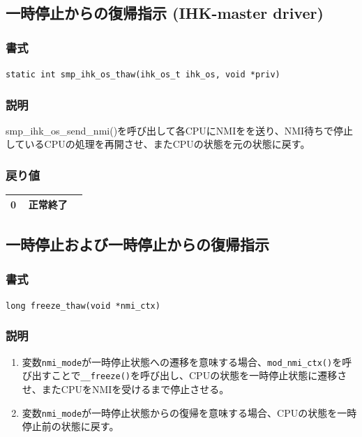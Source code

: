 \documentclass[twoside,11pt,fleqn]{book}
\begin{document}
\subsection{一時停止からの復帰指示 (IHK-master driver)}
\subsubsection*{書式}{\quad} \texttt{static int smp\_ihk\_os\_thaw(ihk\_os\_t ihk\_os, void *priv)}
\subsubsection*{説明}{\quad} 
smp\_ihk\_os\_send\_nmi()を呼び出して各CPUにNMIをを送り、NMI待ちで停止しているCPUの処理を再開させ、またCPUの状態を元の状態に戻す。
\subsubsection*{戻り値}{\quad}
\begin{table}[!h]
\footnotesize
\begin{tabular}{|p{0.20\linewidth}|p{0.66\linewidth}|} \hline
0&正常終了\\ \hline
\end{tabular}
\vspace{-0em}
\end{table}
\FloatBarrier


\subsection{一時停止および一時停止からの復帰指示}
\subsubsection*{書式}{\quad} \texttt{long freeze\_thaw(void *nmi\_ctx)}
\subsubsection*{説明}{\quad} 
\begin{enumerate}
\item 変数\texttt{nmi\_mode}が一時停止状態への遷移を意味する場合、\texttt{mod\_nmi\_ctx()}を呼び出すことで\texttt{\_\_freeze()}を呼び出し、CPUの状態を一時停止状態に遷移させ、またCPUをNMIを受けるまで停止させる。
\item 変数\texttt{nmi\_mode}が一時停止状態からの復帰を意味する場合、CPUの状態を一時停止前の状態に戻す。
\end{enumerate}
\end{document}
